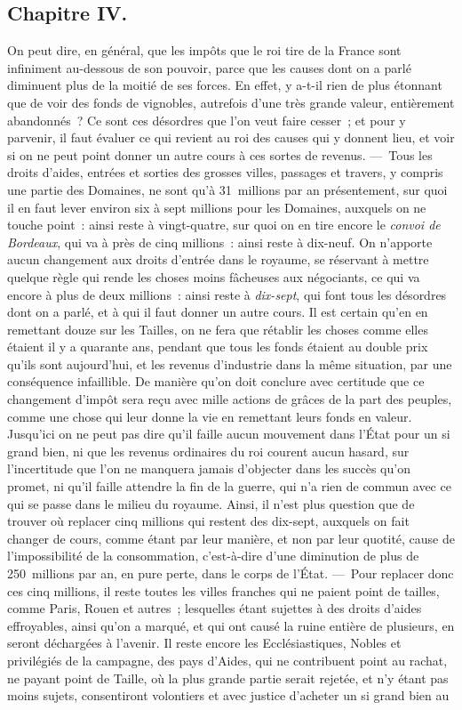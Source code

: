 \documentclass[french,twoside]{book} %
\begin{document}
\subsection[{Chapitre IV.}]{Chapitre IV.}
\noindent On peut dire, en général, que les impôts que le roi tire de la France sont infiniment au-dessous de son pouvoir, parce que les causes dont on a parlé diminuent plus de la moitié de ses forces. En effet, y a-t-il rien de plus étonnant que de voir des fonds de vignobles, autrefois d’une très grande valeur, entièrement abandonnés ? Ce sont ces désordres que l’on veut faire cesser ; et pour y parvenir, il faut évaluer ce qui revient au roi des causes qui y donnent lieu, et voir si on ne peut point donner un autre cours à ces sortes de revenus. — Tous les droits d’aides, entrées et sorties des grosses villes, passages et travers, y compris une partie des Domaines, ne sont qu’à 31 millions par an présentement, sur quoi il en faut lever environ six à sept millions pour les Domaines, auxquels on ne touche point : ainsi reste à vingt-quatre, sur quoi on en tire encore le {\itshape convoi de Bordeaux}, qui va à près de cinq millions : ainsi reste à dix-neuf. On n’apporte aucun changement aux droits d’entrée dans le royaume, se réservant à mettre quelque règle qui rende les choses moins fâcheuses aux négociants, ce qui va encore à plus de deux millions : ainsi reste à {\itshape dix-sept}, qui font tous les désordres dont on a parlé, et à qui il faut donner un autre cours. Il est certain qu’en en remettant douze sur les Tailles, on ne fera que rétablir les choses comme elles étaient il y a quarante ans, pendant que tous les fonds étaient au double prix qu’ils sont aujourd’hui, et les revenus d’industrie dans la même situation, par une conséquence infaillible. De manière qu’on doit conclure avec certitude que ce changement d’impôt sera reçu avec mille actions de grâces de la part des peuples, comme une chose qui leur donne la vie en remettant leurs fonds en valeur. Jusqu’ici on ne peut pas dire qu’il faille aucun mouvement dans l’État pour un si grand bien, ni que les revenus ordinaires du roi courent aucun hasard, sur l’incertitude que l’on ne manquera jamais d’objecter dans les succès qu’on promet, ni qu’il faille attendre la fin de la guerre, qui n’a rien de commun avec ce qui se passe dans le milieu du royaume. Ainsi, il n’est plus question que de trouver où replacer cinq millions qui restent des dix-sept, auxquels on fait changer de cours, comme étant par leur manière, et non par leur quotité, cause de l’impossibilité de la consommation, c’est-à-dire d’une diminution de plus de 250 millions par an, en pure perte, dans le corps de l’État. — Pour replacer donc ces cinq millions, il reste toutes les villes franches qui ne paient point de tailles, comme Paris, Rouen et autres ; lesquelles étant sujettes à des droits d’aides effroyables, ainsi qu’on a marqué, et qui ont causé la ruine entière de plusieurs, en seront déchargées à l’avenir. Il reste encore les Ecclésiastiques, Nobles et privilégiés de la campagne, des pays d’Aides, qui ne contribuent point au rachat, ne payant point de Taille, où la plus grande partie serait rejetée, et n’y étant pas moins sujets, consentiront volontiers et avec justice d’acheter un si grand bien au 
\end{document}
